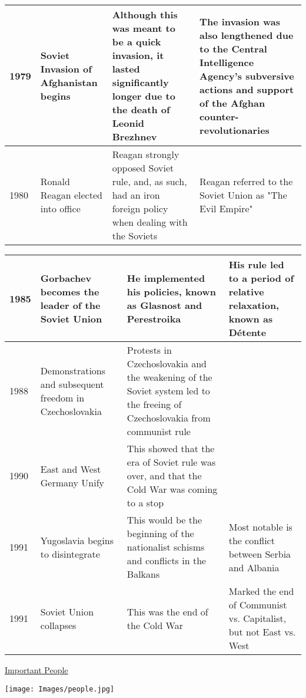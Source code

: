 \documentclass[12pt]{article}
\begin{document}
\begin{enumerate}
\begin{tabular}{|p{}|p{}|p{}|p{}|}
1979 & Soviet Invasion of Afghanistan begins  & Although this was meant to be a quick invasion, it lasted significantly longer due to the death of Leonid Brezhnev  & The invasion was also lengthened due to the Central Intelligence Agency's subversive actions and support of the Afghan counter-revolutionaries  \\
\hline
1980 & Ronald Reagan elected into office  & Reagan strongly opposed Soviet rule, and, as such, had an iron foreign policy when dealing with the Soviets  & Reagan referred to the Soviet Union as "The Evil Empire"  \\
\hline
\end{tabular}
\newpage
\hspace{-25pt}\begin{tabular}{|p{}|p{}|p{}|p{}|}
\hline
1985 & Gorbachev becomes the leader of the Soviet Union  & He implemented his policies, known as Glasnost and Perestroika  & His rule led to a period of relative relaxation, known as D\'etente  \\
\hline
1988 & Demonstrations and subsequent freedom in Czechoslovakia  & Protests in Czechoslovakia and the weakening of the Soviet system led to the freeing of Czechoslovakia from communist rule  & \\
\hline
1990 & East and West Germany Unify  & This showed that the era of Soviet rule was over, and that the Cold War was coming to a stop  &   \\
\hline
1991 & Yugoslavia begins to disintegrate & This would be the beginning of the nationalist schisms and conflicts in the Balkans  & Most notable is the conflict between Serbia and Albania  \\
\hline
1991 & Soviet Union collapses & This was the end of the Cold War  & Marked the end of Communist vs. Capitalist, but not East vs. West  \\
\hline
\end{tabular}


\newpage
\begin{center}
\end{center}
\begin{center}
\end{center}
\begin{center}
\underline{\Huge Important People}
\end{center}
\vspace{50pt}
\begin{center}
  \texttt{[image: Images/people.jpg]}
\end{center}
\newpage


\end{enumerate}
\end{document}
